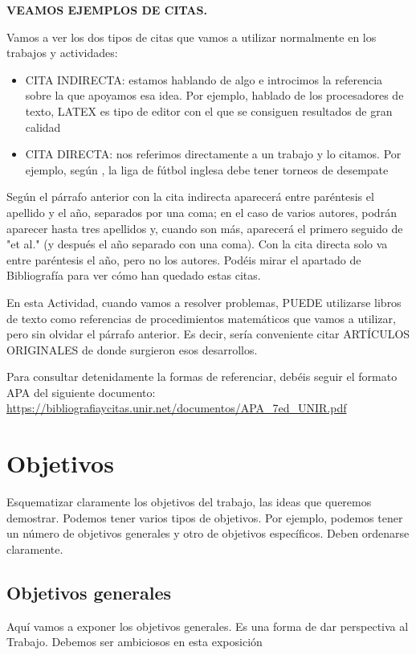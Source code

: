 \documentclass[11pt,a4paper,spanish]{book}
\begin{document}
\vspace{1cm}
{\bf{VEAMOS EJEMPLOS DE CITAS.}}

Vamos a ver los dos tipos de citas que vamos a utilizar normalmente en los trabajos y actividades:
\begin{itemize}
	\item CITA INDIRECTA: estamos hablando de algo e introcimos la referencia sobre la que apoyamos esa idea. Por ejemplo, hablado de los procesadores de texto, LATEX  \citep{lamport1994} es tipo de editor con el que se consiguen resultados de gran calidad
	\item CITA DIRECTA: nos referimos directamente a un trabajo y lo citamos. Por ejemplo, según \cite{ackerman2017}, la liga de fútbol inglesa debe tener torneos de desempate
\end{itemize}
\newline

Según el párrafo anterior con la cita indirecta aparecerá entre paréntesis el apellido y el año, separados por una coma; en el caso de varios autores, podrán aparecer hasta tres apellidos y, cuando son más, aparecerá el primero seguido de "et al." (y después el año separado con una coma). Con la cita directa solo va entre paréntesis el año, pero no los autores. Podéis mirar el apartado de Bibliografía para ver cómo han quedado estas citas.
\newline

En esta Actividad, cuando vamos a resolver problemas, PUEDE utilizarse libros de texto como referencias de procedimientos matemáticos que vamos a utilizar, pero sin olvidar el párrafo anterior. Es decir, sería conveniente citar ARTÍCULOS ORIGINALES de donde surgieron esos desarrollos.
\newline

Para consultar detenidamente la formas de referenciar, debéis seguir el formato APA del siguiente documento: \url{https://bibliografiaycitas.unir.net/documentos/APA_7ed_UNIR.pdf}


\chapter{Objetivos}

Esquematizar claramente los objetivos del trabajo, las ideas que queremos demostrar. Podemos tener varios tipos de objetivos. Por ejemplo, podemos tener un número de objetivos generales y otro de objetivos específicos. Deben ordenarse claramente.

\section{Objetivos generales}
Aquí vamos a exponer los objetivos generales. Es una forma de dar perspectiva al Trabajo. Debemos ser ambiciosos en esta exposición
\end{document}

